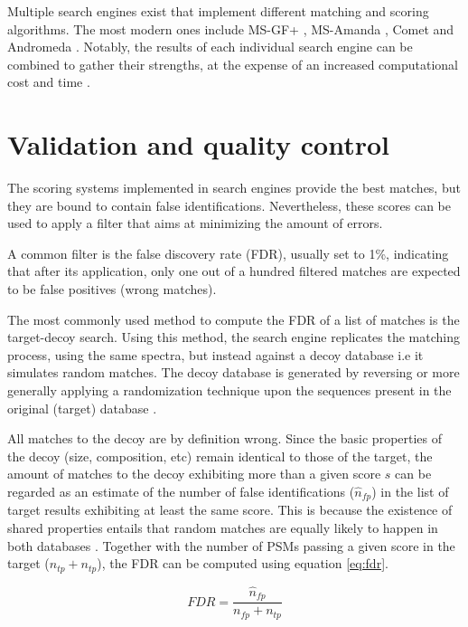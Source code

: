 Multiple search engines exist that implement different matching and scoring algorithms. The most modern ones include MS-GF+ \cite{Kim2014}, MS-Amanda \cite{Dorfer2014}, Comet \cite{Eng2013} and Andromeda \cite{Cox2011}. Notably, the results of each individual search engine can be combined to gather their strengths, at the expense of an increased computational cost and time \cite{Shteynberg2013}.



\section{Validation and quality control}
\label{sec:validation}

The scoring systems implemented in search engines provide the best matches, but they are bound to contain false identifications. Nevertheless, these scores can be used to apply a filter that aims at minimizing the amount of errors.

A common filter is the false discovery rate (FDR), usually set to 1\%, indicating that after its application, only one out of a hundred filtered matches are expected to be false positives (wrong matches).

The most commonly used method to compute the \ac{FDR} of a list of matches is the target-decoy search. Using this method, the search engine replicates the matching process, using the same spectra, but instead against a decoy database i.e it simulates random matches. The decoy database is generated by reversing or more generally applying a randomization technique upon the sequences present in the original (target) database \cite{Elias2010}. 

All matches to the decoy are by definition wrong. Since the basic properties of the decoy (size, composition, etc) remain identical to those of the target, the amount of matches to the decoy exhibiting more than a given score $s$ can be regarded as an estimate of the number of false identifications ($\hat{n}_{fp}$) in the list of target results exhibiting at least the same score. This is because the existence of shared properties entails that random matches are equally likely to happen in both databases \cite{Elias2010}. Together with the number of PSMs passing a given score in the target ($n_{tp} + n_{tp}$), the FDR can be computed using equation \ref{eq:fdr}.

\begin{equation}\label{eq:fdr}
FDR = \frac{\hat{n}_{fp}}{n_{fp} + n_{tp}}
\end{equation}

